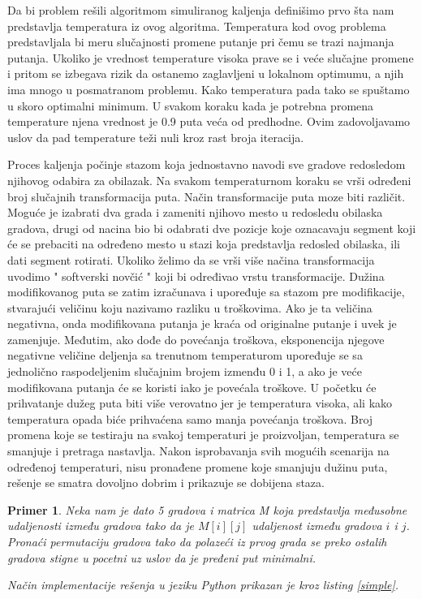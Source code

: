 \documentclass[a4paper]{article}
\newtheorem{primer}{Primer}[section]
\begin{document}
Da bi problem rešili algoritmom simuliranog kaljenja definišimo prvo šta nam predstavlja temperatura iz ovog algoritma. Temperatura kod ovog problema predstavljala bi meru slučajnosti promene putanje pri čemu se trazi najmanja putanja. Ukoliko je vrednost temperature visoka prave se i veće slučajne promene i pritom se izbegava rizik da ostanemo zaglavljeni u lokalnom optimumu, a njih ima mnogo u posmatranom problemu. Kako temperatura pada tako se spuštamo u skoro optimalni minimum. U svakom koraku kada je potrebna promena temperature njena vrednost je 0.9 puta veća od predhodne. Ovim zadovoljavamo uslov da pad temperature teži nuli kroz rast broja iteracija.\par

Proces kaljenja počinje stazom koja jednostavno navodi sve gradove redosledom njihovog odabira za obilazak. Na svakom temperaturnom koraku se vrši određeni broj slučajnih transformacija puta. Način transformacije puta moze biti različit. Moguće je izabrati dva grada i zameniti njihovo mesto u redosledu obilaska gradova, drugi od nacina bio bi odabrati dve pozicje koje oznacavaju segment koji će se prebaciti na određeno mesto u stazi koja predstavlja redosled obilaska, ili dati segment rotirati. Ukoliko želimo da se vrši više načina transformacija uvodimo " softverski novčić " koji bi određivao vrstu transformacije. 
 Dužina modifikovanog puta se zatim izračunava i upoređuje sa stazom pre modifikacije, stvarajući veličinu koju nazivamo razliku u troškovima. Ako je ta veličina negativna, onda modifikovana putanja je kraća od originalne putanje i uvek je zamenjuje. Međutim, ako dođe do povećanja troškova, eksponencija njegove negativne veličine deljenja sa trenutnom temperaturom upoređuje se sa jednolično raspodeljenim slučajnim brojem izmenđu 0 i 1, a ako je veće modifikovana putanja će se koristi iako je povećala troškove. U početku će prihvatanje dužeg puta biti više verovatno jer je temperatura visoka, ali kako temperatura opada biće prihvaćena samo manja povećanja troškova. Broj promena koje se testiraju na svakoj temperaturi je proizvoljan, temperatura se smanjuje i pretraga nastavlja. Nakon isprobavanja svih mogućih scenarija na određenoj temperaturi, nisu pronađene promene koje smanjuju dužinu puta, rešenje se smatra dovoljno dobrim i prikazuje se dobijena staza.

\begin{primer}
Neka nam je dato 5 gradova i matrica M koja predstavlja međusobne udaljenosti između gradova tako da je $M[i][j]$ udaljenost između gradova $i$ i $j$. Pronaći permutaciju gradova tako da polazeći iz prvog grada se preko ostalih gradova stigne u pocetni uz uslov da je pređeni put minimalni.\par
Način implementacije rešenja u jeziku Python prikazan je kroz listing \ref{simple}. 
\end{primer}
\end{document}
